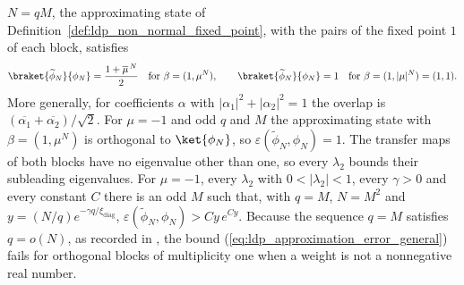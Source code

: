 \begin{lemma}
    $N=qM$, the approximating state of
    Definition~\ref{def:ldp_non_normal_fixed_point}, with the pairs of the fixed
    point $1$ of each block, satisfies
    \begin{align}
        \braket{\widetilde\phi_N}{\phi_N}=\frac{1+\overline\mu^{\,N}}2
        \quad\text{for }\beta=(1,\mu^N),\qquad
        \braket{\widetilde\phi_N}{\phi_N}=1
        \quad\text{for }\beta=(1,\lvert\mu\rvert^N)=(1,1).
        \label{eq:ldp_phase_weights_overlap}
    \end{align}
    More generally, for coefficients $\alpha$ with
    $\lvert\alpha_1\rvert^2+\lvert\alpha_2\rvert^2=1$ the overlap is
    $(\overline{\alpha_1}+\overline{\alpha_2})/\sqrt2$. For $\mu=-1$ and odd $q$ and
    $M$ the approximating state with $\beta=(1,\mu^N)$ is orthogonal to $\ket{\phi_N}$,
    so $\varepsilon(\widetilde\phi_N,\phi_N)=1$. The transfer maps of both blocks have
    no eigenvalue other than one, so every $\lambda_2$ bounds their subleading
    eigenvalues. For $\mu=-1$, every $\lambda_2$ with $0<\lvert\lambda_2\rvert<1$, every
    $\gamma>0$ and every constant $C$ there is an odd $M$ such that, with $q=M$,
    $N=M^2$ and $y=(N/q)e^{-\gamma q/\xi_{\mathrm{diag}}}$,
    $\varepsilon(\widetilde\phi_N,\phi_N)>Cy\,e^{Cy}$. Because the sequence $q=M$
    satisfies $q=o(N)$, as recorded in \cite{gap:mswc24_block_form_mixed_overlap},
    the bound (\ref{eq:ldp_approximation_error_general}) fails for orthogonal blocks of
    multiplicity one when a weight is not a nonnegative real number.
\end{lemma}

